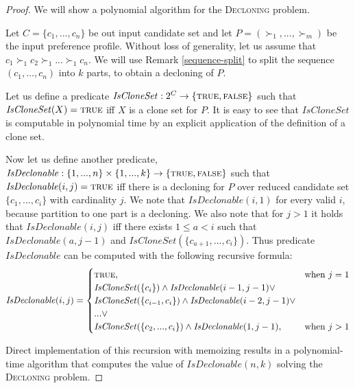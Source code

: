 \begin{proof}
We will show a polynomial algorithm for the \textsc{Decloning} problem.

Let $C = \{c_1, ..., c_n\}$ be out input candidate set
and let $P = (\succ_1, ... , \succ_m)$ be the input preference profile.
Without loss of generality, let us assume that $c_1 \succ_1 c_2 \succ_1 ... \succ_1 c_n$.
We will use Remark \ref{sequence-split} to split the sequence $(c_1, ..., c_n)$
into $k$ parts, to obtain a decloning of $P$.

Let us define a predicate
$\mathit{IsCloneSet}: 2^C \rightarrow \{\text{\textsc{true}},\text{\textsc{false}}\}$
such that $\mathit{IsCloneSet}(X) = \text{\textsc{true}}$ iff $X$ is a clone set for $P$.
It is easy to see that $\mathit{IsCloneSet}$ is computable in polynomial time
by an explicit application of the definition of a clone set.

Now let us define another predicate,
$\mathit{IsDeclonable}: \{1,...,n\}\times\{1,...,k\} \rightarrow \{\text{\textsc{true}},\text{\textsc{false}}\}$
such that $\mathit{IsDeclonable}(i,j) = \text{\textsc{true}}$
iff there is a decloning for $P$ over reduced candidate set $\{c_1,...,c_i\}$
with cardinality $j$.
We note that $\mathit{IsDeclonable}(i, 1)$ for every valid $i$, because partition to one part is a decloning.
We also note that for $j>1$ it holds that $\mathit{IsDeclonable}(i,j)$ iff
there exists $1 \leq a < i$ such that $\mathit{IsDeclonable}(a,j-1)$ and $\mathit{IsCloneSet}(\{c_{a+1}, ..., c_i\})$.
Thus predicate $\mathit{IsDeclonable}$ can be computed with the following recursive formula:
$$ \mathit{IsDeclonable}(i,j) =
\begin{cases}
\text{\textsc{true}},	&\text{when $j=1$} \\
\mathit{IsCloneSet}(\{c_i\}) \wedge \mathit{IsDeclonable}(i-1,j-1) \vee \\
\mathit{IsCloneSet}(\{c_{i-1},c_i\}) \wedge \mathit{IsDeclonable}(i-2, j-1) \vee \\
... \vee \\
\mathit{IsCloneSet}(\{c_2,...,c_i\}) \wedge \mathit{IsDeclonable}(1,j-1)
, 		&\text{when $j>1$}
\end{cases}
$$

Direct implementation of this recursion with memoizing
results in a polynomial-time algorithm that computes the value of $IsDeclonable(n,k)$
solving the \textsc{Decloning} problem.
\end{proof}
